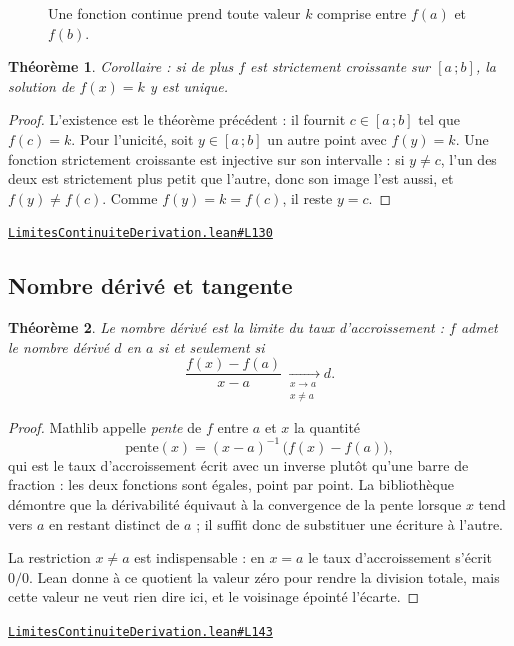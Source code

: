 \documentclass[11pt,a4paper]{article}
\theoremstyle{definition}
\theoremstyle{plain}
\newtheorem{theoreme}{Théorème}
\newcommand{\source}[2]{\par\smallskip\noindent\hfill{\footnotesize\href{#1}{\texttt{#2}}}\par\smallskip}
\begin{document}
\begin{figure}[h]
\centering

\caption{Une fonction continue prend toute valeur $k$ comprise entre $f(a)$ et $f(b)$.}
\end{figure}

\begin{theoreme}
Corollaire : si de plus $f$ est strictement croissante sur $[a\,;b]$, la solution de
$f(x) = k$ y est unique.
\end{theoreme}

\begin{proof}
L'existence est le théorème précédent : il fournit $c \in [a\,;b]$ tel que $f(c) = k$.
Pour l'unicité, soit $y \in [a\,;b]$ un autre point avec $f(y) = k$. Une fonction
strictement croissante est injective sur son intervalle : si $y \ne c$, l'un des deux est
strictement plus petit que l'autre, donc son image l'est aussi, et $f(y) \ne f(c)$. Comme
$f(y) = k = f(c)$, il reste $y = c$.
\end{proof}
\source{https://github.com/Commutator-IO/learn-lean/blob/main/courses/02-lycee/04-limites-continuite-derivation/LimitesContinuiteDerivation.lean\#L130}{LimitesContinuiteDerivation.lean\#L130}

\subsection{Nombre dérivé et tangente}

\begin{theoreme}
Le nombre dérivé est la limite du taux d'accroissement : $f$ admet le nombre dérivé $d$
en $a$ si et seulement si
\[ \frac{f(x) - f(a)}{x - a} \xrightarrow[\substack{x \to a \\ x \ne a}]{} d . \]
\end{theoreme}

\begin{proof}
Mathlib appelle \emph{pente} de $f$ entre $a$ et $x$ la quantité
\[ \mathrm{pente}(x) = (x - a)^{-1}\,\bigl(f(x) - f(a)\bigr) , \]
qui est le taux d'accroissement écrit avec un inverse plutôt qu'une barre de fraction :
les deux fonctions sont égales, point par point. La bibliothèque démontre que la
dérivabilité équivaut à la convergence de la pente lorsque $x$ tend vers $a$ en restant
distinct de $a$ ; il suffit donc de substituer une écriture à l'autre.

\medskip\noindent
La restriction $x \ne a$ est indispensable : en $x = a$ le taux d'accroissement s'écrit
$0/0$. Lean donne à ce quotient la valeur zéro pour rendre la division totale, mais cette
valeur ne veut rien dire ici, et le voisinage épointé l'écarte.
\end{proof}
\source{https://github.com/Commutator-IO/learn-lean/blob/main/courses/02-lycee/04-limites-continuite-derivation/LimitesContinuiteDerivation.lean\#L143}{LimitesContinuiteDerivation.lean\#L143}
\end{document}
